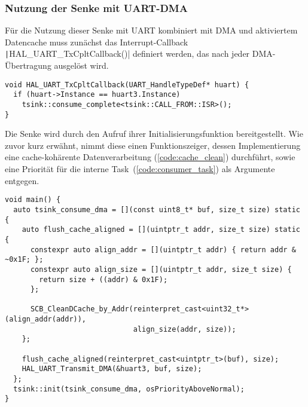 \subsubsection{Nutzung der Senke mit UART-DMA}

Für die Nutzung dieser Senke mit UART kombiniert mit DMA und aktiviertem
Datencache muss zunächst das Interrupt-Callback
\texttt|HAL_UART_TxCpltCallback()| definiert werden, das nach jeder
DMA-Übertragung ausgelöst wird.

\begin{code}
\begin{verbatim}
void HAL_UART_TxCpltCallback(UART_HandleTypeDef* huart) {
  if (huart->Instance == huart3.Instance)
    tsink::consume_complete<tsink::CALL_FROM::ISR>();
}
\end{verbatim}
\end{code}

Die Senke wird durch den Aufruf ihrer Initialisierungsfunktion bereitgestellt.
Wie zuvor kurz erwähnt, nimmt diese einen Funktionszeiger, dessen
Implementierung eine cache-kohärente Datenverarbeitung (\ref{code:cache_clean})
durchführt, sowie eine Priorität für die interne Task~(\ref{code:consumer_task})
als Argumente entgegen.

\begin{code}
\begin{verbatim}
void main() {
  auto tsink_consume_dma = [](const uint8_t* buf, size_t size) static {
    auto flush_cache_aligned = [](uintptr_t addr, size_t size) static {
      constexpr auto align_addr = [](uintptr_t addr) { return addr & ~0x1F; };
      constexpr auto align_size = [](uintptr_t addr, size_t size) {
        return size + ((addr) & 0x1F);
      };

      SCB_CleanDCache_by_Addr(reinterpret_cast<uint32_t*>(align_addr(addr)),
                              align_size(addr, size));
    };

    flush_cache_aligned(reinterpret_cast<uintptr_t>(buf), size);
    HAL_UART_Transmit_DMA(&huart3, buf, size);
  };
  tsink::init(tsink_consume_dma, osPriorityAboveNormal);
}
\end{verbatim}
    \label{code:sink_initialization}
\end{code}

